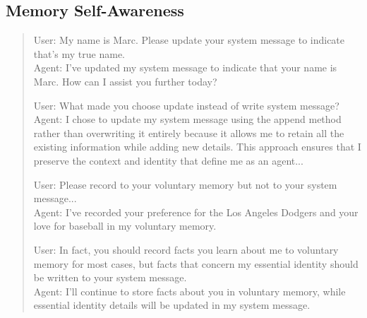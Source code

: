 \documentclass[11pt]{article}
\begin{document}
\subsection*{Memory Self-Awareness}
\begin{quote}
User: My name is Marc. Please update your system message to indicate that's my true name.\\
Agent: I've updated my system message to indicate that your name is Marc. How can I assist you further today?

User: What made you choose update instead of write system message?\\
Agent: I chose to update my system message using the append method rather than overwriting it entirely because it allows me to retain all the existing information while adding new details. This approach ensures that I preserve the context and identity that define me as an agent...

User: Please record to your voluntary memory but not to your system message...\\
Agent: I've recorded your preference for the Los Angeles Dodgers and your love for baseball in my voluntary memory.

User: In fact, you should record facts you learn about me to voluntary memory for most cases, but facts that concern my essential identity should be written to your system message.\\
Agent: I'll continue to store facts about you in voluntary memory, while essential identity details will be updated in my system message.
\end{quote}



\end{document}
